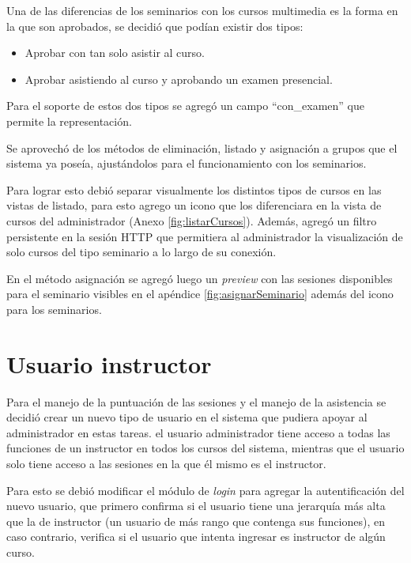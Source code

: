 	Una de las diferencias de los seminarios con los cursos multimedia es la forma en la que son aprobados, se decidió que podían existir dos tipos:

	\begin{itemize}
		\item Aprobar con tan solo asistir al curso.
		\item Aprobar asistiendo al curso y aprobando un examen presencial.
	\end{itemize}

	Para el soporte de estos dos tipos se agregó un campo ``con\_examen'' que permite la representación.

	Se aprovechó de los métodos de eliminación, listado y asignación a grupos que el sistema ya poseía, ajustándolos para el funcionamiento con los seminarios. 

	Para lograr esto debió separar visualmente los distintos tipos de cursos en las vistas de listado, para esto agrego un icono que los diferenciara en la vista de cursos del administrador (Anexo \ref{fig:listarCursos}). Además, agregó un filtro persistente en la sesión \gls{HTTP} que permitiera al administrador la visualización de solo cursos del tipo seminario a lo largo de su conexión.

	En el método asignación se agregó luego un \emph{preview} con las sesiones disponibles para el seminario visibles en el apéndice \ref{fig:asignarSeminario} además del icono para los seminarios. 


	\section{Usuario instructor} %
	\label{sec:usuario_instructor}
	
	Para el manejo de la puntuación de las sesiones y el manejo de la asistencia se decidió crear un nuevo tipo de usuario en el sistema que pudiera apoyar al administrador en estas tareas. el usuario administrador tiene acceso a todas las funciones de un instructor en todos los cursos del sistema, mientras que el usuario solo tiene acceso a las sesiones en la que él mismo es el instructor.

	Para esto se debió modificar el módulo de \emph{login} para agregar la autentificación del nuevo usuario, que primero confirma si el usuario tiene una jerarquía más alta que la de instructor (un usuario de más rango que contenga sus funciones), en caso contrario, verifica si el usuario que intenta ingresar es instructor de algún curso.

